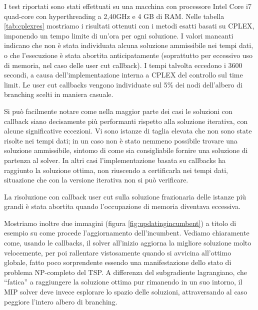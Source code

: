 I test riportati sono stati effettuati su una macchina con processore Intel Core i7 quad-core con hyperthreading a 2,40GHz e 4 GB di RAM. Nelle tabella \ref{tab:cplexres} mostriamo i risultati ottenuti con i metodi esatti basati su CPLEX, imponendo un tempo limite di un'ora per ogni soluzione. I valori mancanti indicano che non è stata individuata alcuna soluzione ammissibile nei tempi dati, o che l'esecuzione è stata abortita anticipatamente (soprattutto per eccessivo uso di memoria, nel caso delle user cut callback). I tempi talvolta eccedono i 3600 secondi, a causa dell'implementazione interna a CPLEX del controllo sul time limit. Le user cut callbacks vengono individuate sul 5\% dei nodi dell'albero di branching scelti in maniera casuale.

Si può facilmente notare come nella maggior parte dei casi le soluzioni con callback siano decisamente più performanti rispetto alla soluzione iterativa, con alcune significative eccezioni. Vi sono istanze di taglia elevata che non sono state risolte nei tempi dati; in un caso non è stato nemmeno possibile trovare una soluzione ammissibile, sintomo di come sia consigliabile fornire una soluzione di partenza al solver. In altri casi l'implementazione basata su callbacks ha raggiunto la soluzione ottima, non riuscendo a certificarla nei tempi dati, situazione che con la versione iterativa non si può verificare.

La risoluzione con callback user cut sulla soluzione frazionaria delle istanze più grandi è stata abortita quando l'occupazione di memoria diventava eccessiva.

Mostriamo inoltre due immagini (figura \ref{fig:updatingincumbent}) a titolo di esempio su come procede l'aggiornamento dell'incumbent. Vediamo chiaramente come, usando le callbacks, il solver all'inizio aggiorna la migliore soluzione molto velocemente, per poi rallentare vistosamente quando si avvicina all'ottimo globale, fatto poco sorprendente essendo una manifestazione dello stato di problema NP-completo del TSP. A differenza del subgradiente lagrangiano, che ``fatica'' a raggiungere la soluzione ottima pur rimanendo in un suo intorno, il MIP solver deve invece esplorare lo spazio delle soluzioni, attraversando al caso peggiore l'intero albero di branching.

